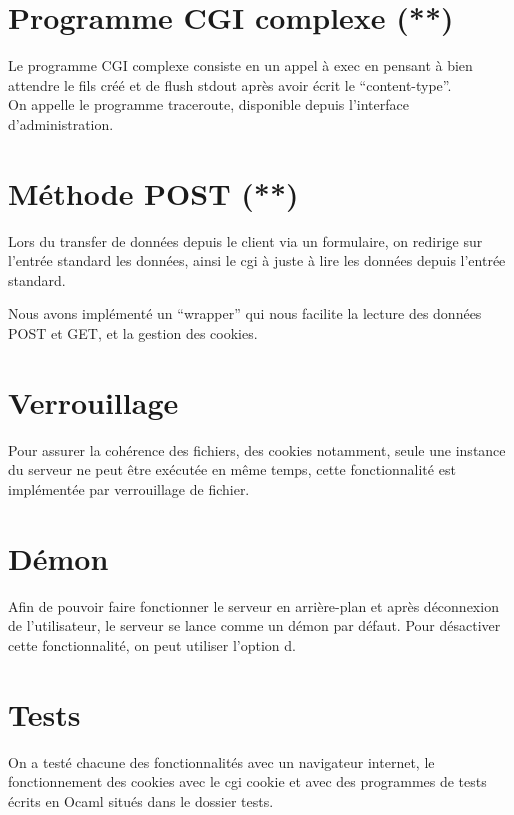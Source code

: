\documentclass{article}
\begin{document}
\section{Programme CGI complexe (**)}

Le programme CGI complexe consiste en un appel à exec en pensant à bien attendre le fils créé et de flush stdout après avoir écrit le ``content-type''.\\

On appelle le programme traceroute, disponible depuis l'interface d'administration.

\section{Méthode POST (**)}

Lors du transfer de données depuis le client via un formulaire, on redirige sur l'entrée standard les données, ainsi le cgi à juste à lire les données depuis l'entrée standard.

Nous avons implémenté un ``wrapper'' qui nous facilite la lecture des données POST et GET, et la gestion des cookies.

\section{Verrouillage}

Pour assurer la cohérence des fichiers, des cookies notamment, seule une instance du serveur ne peut être exécutée
en même temps, cette fonctionnalité est implémentée par verrouillage de fichier.

\section{Démon}

Afin de pouvoir faire fonctionner le serveur en arrière-plan et après déconnexion de l'utilisateur, le serveur se lance
comme un démon par défaut. Pour désactiver cette fonctionnalité, on peut utiliser l'option d.

\section{Tests}

On a testé chacune des fonctionnalités avec un navigateur internet, le fonctionnement des cookies avec le cgi cookie
et avec des programmes de tests écrits en Ocaml situés dans le dossier tests.
\end{document}
